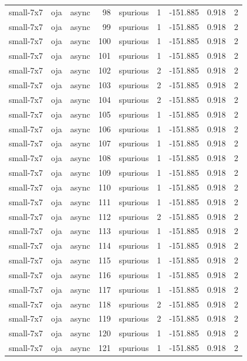 \begin{tabular}{lllrlrrrr}
small-7x7 & oja & async & 98 & spurious & 1 & -151.885 & 0.918 & 2 \\
small-7x7 & oja & async & 99 & spurious & 1 & -151.885 & 0.918 & 2 \\
small-7x7 & oja & async & 100 & spurious & 1 & -151.885 & 0.918 & 2 \\
small-7x7 & oja & async & 101 & spurious & 1 & -151.885 & 0.918 & 2 \\
small-7x7 & oja & async & 102 & spurious & 2 & -151.885 & 0.918 & 2 \\
small-7x7 & oja & async & 103 & spurious & 2 & -151.885 & 0.918 & 2 \\
small-7x7 & oja & async & 104 & spurious & 2 & -151.885 & 0.918 & 2 \\
small-7x7 & oja & async & 105 & spurious & 1 & -151.885 & 0.918 & 2 \\
small-7x7 & oja & async & 106 & spurious & 1 & -151.885 & 0.918 & 2 \\
small-7x7 & oja & async & 107 & spurious & 1 & -151.885 & 0.918 & 2 \\
small-7x7 & oja & async & 108 & spurious & 1 & -151.885 & 0.918 & 2 \\
small-7x7 & oja & async & 109 & spurious & 1 & -151.885 & 0.918 & 2 \\
small-7x7 & oja & async & 110 & spurious & 1 & -151.885 & 0.918 & 2 \\
small-7x7 & oja & async & 111 & spurious & 1 & -151.885 & 0.918 & 2 \\
small-7x7 & oja & async & 112 & spurious & 2 & -151.885 & 0.918 & 2 \\
small-7x7 & oja & async & 113 & spurious & 1 & -151.885 & 0.918 & 2 \\
small-7x7 & oja & async & 114 & spurious & 1 & -151.885 & 0.918 & 2 \\
small-7x7 & oja & async & 115 & spurious & 1 & -151.885 & 0.918 & 2 \\
small-7x7 & oja & async & 116 & spurious & 1 & -151.885 & 0.918 & 2 \\
small-7x7 & oja & async & 117 & spurious & 1 & -151.885 & 0.918 & 2 \\
small-7x7 & oja & async & 118 & spurious & 2 & -151.885 & 0.918 & 2 \\
small-7x7 & oja & async & 119 & spurious & 2 & -151.885 & 0.918 & 2 \\
small-7x7 & oja & async & 120 & spurious & 1 & -151.885 & 0.918 & 2 \\
small-7x7 & oja & async & 121 & spurious & 1 & -151.885 & 0.918 & 2 \\

\end{tabular}
